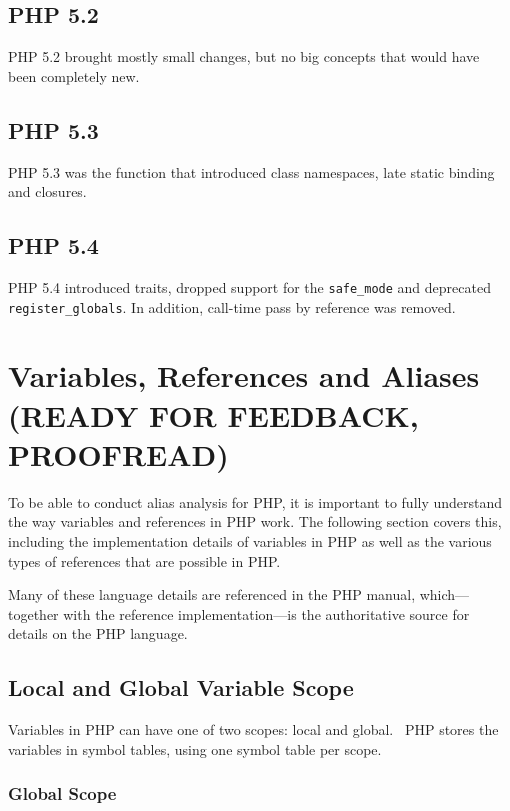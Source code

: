 \subsection{PHP 5.2}

PHP 5.2 brought mostly small changes, but no big concepts that would have been completely new.


\subsection{PHP 5.3}

PHP 5.3 was the function that introduced class namespaces, late static binding and closures.


\subsection{PHP 5.4}

PHP 5.4 introduced traits, dropped support for the \texttt{safe\_mode} and deprecated \texttt{register\_globals}. In addition, call-time pass by reference was removed.


\section{Variables, References and Aliases (READY FOR FEEDBACK, PROOFREAD)}
\label{php-variables}

To be able to conduct alias analysis for PHP, it is important to fully understand the way variables and references in PHP work. The following section covers this, including the implementation details of variables in PHP as well as the various types of references that are possible in PHP.

Many of these language details are referenced in the PHP manual, which---together with the reference implementation---is the authoritative source for details on the PHP language.


\subsection{Local and Global Variable Scope}
\label{sec:variable-scope}

Variables in PHP can have one of two scopes: local and global.~\cite{php-manual-scope} PHP stores the variables in symbol tables, using one symbol table per scope.~\cite{php-manual-reference-counting}

\subsubsection{Global Scope}

